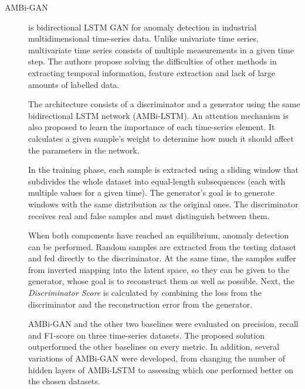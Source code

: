 \begin{description}
    \item[AMBi-GAN \cite{kong.etal_IntegratedGenerativeModel_2023}] is bidirectional LSTM GAN for anomaly detection in industrial multidimensional time-series data. Unlike univariate time series, multivariate time series consists of multiple measurements in a given time step. The authors propose solving the difficulties of other methods in extracting temporal information, feature extraction and lack of large amounts of labelled data.

    The architecture consists of a discriminator and a generator using the same bidirectional LSTM network (AMBi-LSTM). An attention mechanism is also proposed to learn the importance of each time-series element. It calculates a given sample's weight to determine how much it should affect the parameters in the network.

    In the training phase, each sample is extracted using a sliding window that subdivides the whole dataset into equal-length subsequences (each with multiple values for a given time). The generator's goal is to generate windows with the same distribution as the original ones. The discriminator receives real and false samples and must distinguish between them.

    When both components have reached an equilibrium, anomaly detection can be performed. Random samples are extracted from the testing dataset and fed directly to the discriminator. At the same time, the samples suffer from inverted mapping into the latent space, so they can be given to the generator, whose goal is to reconstruct them as well as possible. Next, the \textit{Discriminator Score} is calculated by combining the loss from the discriminator and the reconstruction error from the generator. 

    AMBi-GAN and the other two baselines were evaluated on precision, recall and F1-score on three time-series datasets. The proposed solution outperformed the other baselines on every metric. In addition, several variations of AMBi-GAN were developed, from changing the number of hidden layers of AMBi-LSTM to assessing which one performed better on the chosen datasets.
\end{description}


